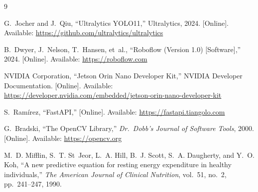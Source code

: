 \documentclass[11pt,a4paper]{article}
\begin{document}
\begin{thebibliography}{9}

G.~Jocher and J.~Qiu, ``Ultralytics YOLO11,'' Ultralytics, 2024. [Online]. Available: \url{https://github.com/ultralytics/ultralytics}

B.~Dwyer, J.~Nelson, T.~Hansen, et~al., ``Roboflow (Version 1.0) [Software],'' 2024. [Online]. Available: \url{https://roboflow.com}

NVIDIA Corporation, ``Jetson Orin Nano Developer Kit,'' NVIDIA Developer Documentation. [Online]. Available: \url{https://developer.nvidia.com/embedded/jetson-orin-nano-developer-kit}

S.~Ram\'irez, ``FastAPI,'' [Online]. Available: \url{https://fastapi.tiangolo.com}

G.~Bradski, ``The OpenCV Library,'' \emph{Dr.\ Dobb's Journal of Software Tools}, 2000. [Online]. Available: \url{https://opencv.org}

M.~D. Mifflin, S.~T. St~Jeor, L.~A. Hill, B.~J. Scott, S.~A. Daugherty, and Y.~O. Koh, ``A new predictive equation for resting energy expenditure in healthy individuals,'' \emph{The American Journal of Clinical Nutrition}, vol.~51, no.~2, pp.~241--247, 1990.

\end{thebibliography}
\end{document}
